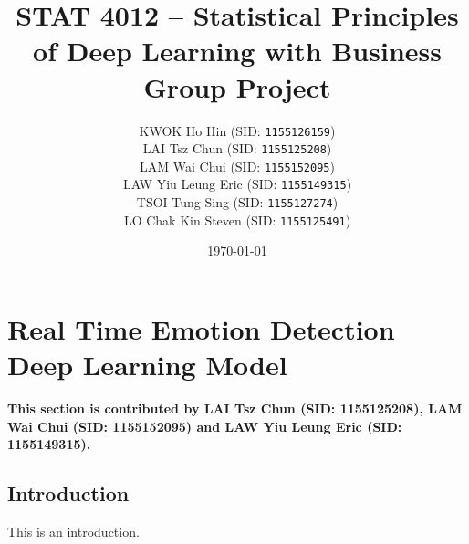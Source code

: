 \documentclass[11pt,a4paper]{article}
\begin{document}
    
    \thispagestyle{empty}
    \title{\textsc{STAT 4012} -- Statistical Principles of Deep Learning with Business \\ Group Project}
    \author{
        KWOK Ho Hin (SID: \texttt{1155126159}) \\
        LAI Tsz Chun (SID: \texttt{1155125208}) \\
        LAM Wai Chui (SID: \texttt{1155152095}) \\
        LAW Yiu Leung Eric (SID: \texttt{1155149315}) \\
        TSOI Tung Sing (SID: \texttt{1155127274}) \\
        LO Chak Kin Steven (SID: \texttt{1155125491})
    }
    \date{\today}
    \maketitle
    
    \tableofcontents
    \thispagestyle{empty}
    \newpage
    
    \setcounter{page}{1}
    
    \section{Real Time Emotion Detection Deep Learning Model}
    \textbf{This section is contributed by LAI Tsz Chun (SID: 1155125208), LAM Wai Chui (SID: 1155152095) and LAW Yiu Leung Eric (SID: 1155149315).}
    
    \subsection{Introduction}
    This is an introduction.
    
\end{document}
